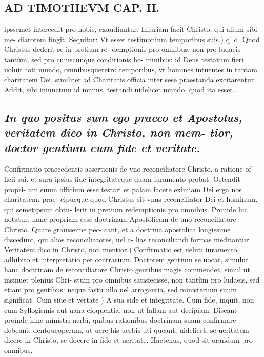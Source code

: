\documentclass{article}
\begin{document}
\begin{pages}
\section*{AD TIMOTHEVM CAP. II. }
\marginpar{[ p.69 ]}\pstart ipssemet intercedit pro nobis, exaudiuntur. Iniuriam facit Christo, qui alium sibi me- diatorem fingit. Sequitur:  \pend\pstart Vt esset testimonium temporibus suis.) q' d. Quod Christus dederit se in pretium re- demptionis pro omnibus, non pro ludaeis tantùm, sed pro cuiuscunque  conditionis ho- minibus: id Deus testatum fieri uoluit toti mundo, omnibusqueretro temporibus, vt homines intuentes in tantam charitatem Dei, similiter ad Charitatis officia inter sese praestanda excitarentur. Addit, sibi iniunctum id munus, testandi uidelicet mundo, quod ita esset.  \pend
{}
{}
\subsection*{\textit{In quo positus sum ego praeco et Apostolus, veritatem dico in Christo, non mem- tior, doctor gentium cum fide et veritate. }}\pstart Confirmatio praecedentis assertionis de vno reconciliatore Christo, a ratione of- ficii sui, et sura ipsius fide integritateque  quam iuramento probat. Ostendit propri- um suum officium esse testari et palam facere eximiam Dei erga nos charitatem, prae- cipueque  quod Christus sit vnus reconciliator Dei et hominum, qui semetipsum obtu- lerit in pretium redemptionis pro omnibus. Pronide hic notatur, hanc propriam esse doctrinam Apostolicam de uno reconciliatore Christo. Quare grauiseime pec- cant, et a doctrina apostolica longissime discedunt, qui alios reconciliatores, uel a- lias reconciliandi formas meditantur.  \pend\pstart Veritatem dico in Christo, non mentior.) Confirmatio est ueluti iuramento adhibito et interpretatio per contrarium. Doctorem gentium se uocat, simulut hanc doctrinam de reconciliatore Christo gentibus magis commendet, simul ut insinuet plenius Chri- stum pro omnibus satisfecisse, non tantùm pro ludaeis, sed etiam pro gentibus: neque fastu ullo uel arrogantia, sed ministerium suum significat.  \pend\pstart Cum siue et vertate ) A sua side et integritate. Cum fide, inquit, non cum Syllogismis aut uana eloquentia, non ut fallam aut decipiam. Discant proinde hinc ministri uerbi, quibus rationibus doctrinam suam confirmare debeant, dentqueoperam, ut uere his uerbis uti queant, uidelicet, se ueritatem dicere in Christo, se docere in fide et ueritate. Hactenus, quod sit orandum pro omnibus.  \pend
{}
{}

\end{pages}
\end{document}
